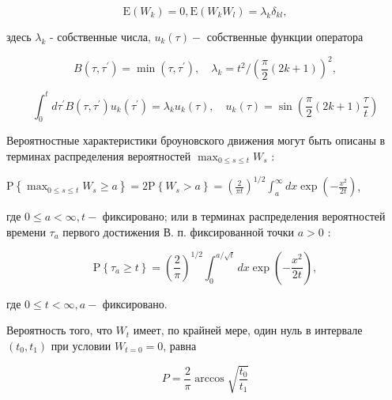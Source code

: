 \documentclass[10pt]{article}
\begin{document}
\[

\mathrm{E}\left(W_{k}\right)=0, \mathrm{E}\left(W_{k} W_{l}\right)=\lambda_{k} \delta_{k l},

\]



здесь $\lambda_{k}$ - собственные числа, $u_{k}(\tau)-$ собственные функции оператора



\[

B\left(\tau, \tau^{\prime}\right)=\min \left(\tau, \tau^{\prime}\right), \quad \lambda_{k}=t^{2} /\left(\frac{\pi}{2}(2 k+1)\right)^{2},

\]



\[

\int_{0}^{t} d \tau^{\prime} B\left(\tau, \tau^{\prime}\right) u_{k}\left(\tau^{\prime}\right)=\lambda_{k} u_{k}(\tau), \quad u_{k}(\tau)=\sin \left(\frac{\pi}{2}(2 k+1) \frac{\tau}{t}\right)

\]



Вероятностные характеристики броуновского движения могут быть описаны в терминах распределения вероятностей $\max _{0 \leqslant s \leqslant t} W_{s}$ :



$\mathrm{P}\left\{\max _{0 \leqslant s \leqslant t} W_{s} \geqslant a\right\}=2 \mathrm{P}\left\{W_{s}>a\right\}=\left(\frac{2}{\pi t}\right)^{1 / 2} \int_{a}^{\infty} d x \exp \left(-\frac{x^{2}}{2 t}\right)$,



где $0 \leqslant a<\infty, t-$ фиксировано; или в терминах распределения вероятностей времени $\tau_{a}$ первого достижения В. п. фиксированной точки $a>0$ :



\[

\mathrm{P}\left\{\tau_{a} \geqslant t\right\}=\left(\frac{2}{\pi}\right)^{1 / 2} \int_{0}^{a / \sqrt{t}} d x \exp \left(-\frac{x^{2}}{2 t}\right),

\]



где $0 \leqslant t<\infty, a-$ фиксировано.



Вероятность того, что $W_{t}$ имеет, по крайней мере, один нуль в интервале $\left(t_{0}, t_{1}\right)$ при условии $W_{t=0}=0$, равна



\[

P=\frac{2}{\pi} \arccos \sqrt{\frac{t_{0}}{t_{1}}}

\]
\end{document}
